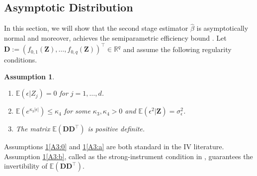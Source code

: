 \documentclass[11pt, preprint]{imsart}
\numberwithin{equation}{section}
\def \bfD{\mathbf{D}}
\def \bfZ{\mathbf{Z}}
\def \bfD{\mathbf{D}}
\def \ev{\mathbb{E}}
\theoremstyle{plain}
\newtheorem{Assumption}{Assumption}
\theoremstyle{definition}
\begin{document}
\subsection{Asymptotic Distribution}
In this section, we will show that the second stage estimator $\widehat{\beta}$ is asymptotically normal and moreover, achieves the semiparametric efficiency bound \citep{n90}. Let $\bfD:=(f_{0,1}(\bfZ),\ldots, f_{0,q}(\bfZ))^\top \in \mathbb{R}^q$ and assume the following regularity conditions. 
\begin{Assumption}\label{Assumption:A3}
\begin{enumerate}[label={(\roman*}),ref={(\roman*})]
\item \label{A3:0} $\ev(\epsilon|Z_j)=0$ for $j=1,\ldots, d$.
\item \label{A3:a} $\ev(e^{\kappa_3|\epsilon|})\leq \kappa_4$ for some $\kappa_3, \kappa_4>0$ and $\ev(\epsilon^2|\bfZ)=\sigma_\epsilon^2$.
\item \label{A3:b} The matrix $\ev(\bfD\bfD^\top)$ is positive definite.
\end{enumerate}
\end{Assumption}

Assumptions \ref{Assumption:A3}\ref{A3:0} and \ref{Assumption:A3}\ref{A3:a} are both standard in the IV literature. Assumption \ref{Assumption:A3}\ref{A3:b}, called as the strong-instrument condition in \cite{bcch12}, guarantees the invertibility of $\ev(\bfD\bfD^\top)$.
\end{document}
